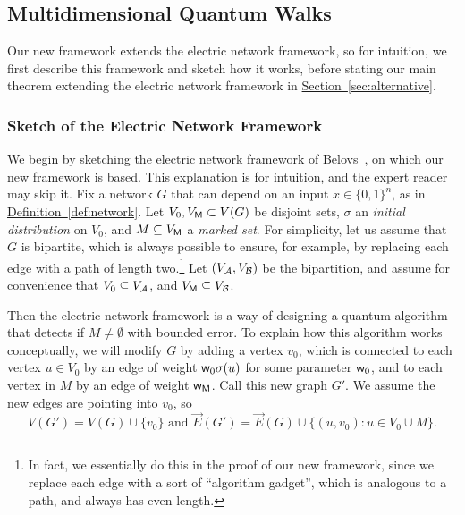 \documentclass{article}
\renewcommand{\sec}[1]{\hyperref[sec:#1]{Section~\ref*{sec:#1}}}
\newcommand{\defin}[1]{\hyperref[def:#1]{Definition~\ref*{def:#1}}}
\renewcommand{\>}{\rangle}
\newcommand{\<}{\langle}
\renewcommand{\(}{\left(}
\renewcommand{\)}{\right)}
\def\w{{\sf w}}
\begin{document}
\subsection{Multidimensional Quantum Walks}\label{sec:full-framework}

Our new framework extends the electric network framework, so for intuition, we first describe this framework and sketch how it works, before stating our main theorem extending the electric network framework in \sec{alternative}.

\subsubsection{Sketch of the Electric Network Framework}\label{sec:sketch}

We begin by sketching the electric network framework of Belovs~\cite{belovs2013ElectricWalks}, on which our new framework is based. This explanation is for intuition, and the expert reader may skip it. 
Fix a network $G$ that can depend on an input $x\in\{0,1\}^n$, as in \defin{network}. Let $V_0,V_{\sf M}\subset V(G)$ be disjoint sets, $\sigma$ an \emph{initial distribution} on $V_0$, and $M\subseteq V_{\sf M}$ a \emph{marked set}. For simplicity, let us assume that $G$ is bipartite, which is always possible to ensure, for example, by replacing each edge with a path of length two.\footnote{In fact, we essentially do this in the proof of our new framework, since we replace each edge with a sort of ``algorithm gadget'', which is analogous to a path, and always has even length.}  Let $(V_{\cal A},V_{\cal B})$ be the bipartition, and assume for convenience that $V_0\subseteq V_{\cal A}$, and $V_{\sf M}\subseteq V_{\cal B}$.

Then the electric network framework is a way of designing a quantum algorithm that detects if $M\neq \emptyset$ with bounded error. 
To explain how this algorithm works conceptually, we will modify $G$ by adding a vertex $v_0$, which is connected to each vertex $u\in V_0$ by an edge of weight $\w_0\sigma(u)$ for some parameter $\w_0$, and to each vertex in $M$ by an edge of weight $\w_{\sf M}$.
Call this new graph $G'$. We assume the new edges are pointing into $v_0$, so 
$$V(G')=V(G)\cup\{v_0\}
\mbox{ and }
\overrightarrow{E}(G')=\overrightarrow{E}(G)\cup\{(u,v_0):u\in V_0\cup M\}.$$
\end{document}

